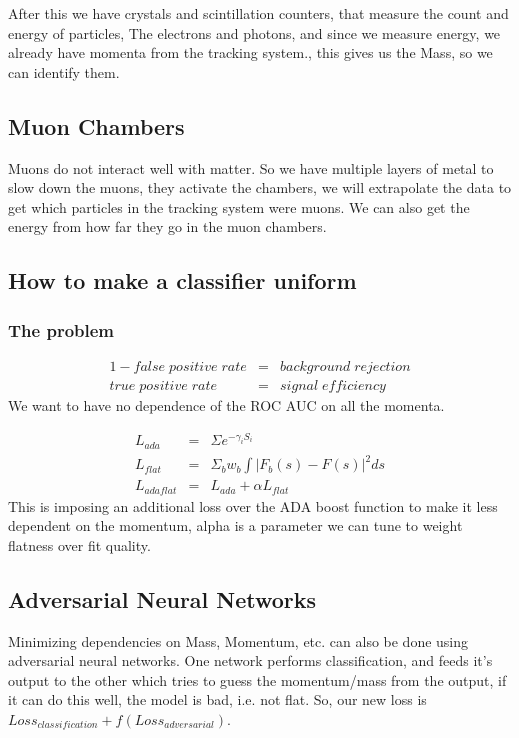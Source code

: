 After this we have crystals and scintillation counters, that measure the count and energy of particles, The electrons and photons, and since we measure energy, we already have momenta from the tracking system., this gives us the Mass, so we can identify them.

\subsection{Muon Chambers}

Muons do not interact well with matter. So we have multiple layers of metal to slow down the muons, they activate the chambers, we will extrapolate the data to get which particles in the tracking system were muons. We can also get the energy from how far they go in the muon chambers.


\subsection{How to make a classifier uniform}

\subsubsection{The problem}
\begin{eqnarray}
1 - false\;positive\;rate &=& background\;rejection \\
true\;positive\;rate &=& signal\;efficiency
\end{eqnarray}
We want to have no dependence of the ROC AUC on all the momenta.

\begin{eqnarray}
  L_{ada} &=& \Sigma e^{-\gamma_i S_i} \\
  L_{flat} &=& \Sigma_b w_b \int |F_b(s) - F(s)|^2 ds \\
  L_{adaflat} &=& L_{ada} + \alpha L_{flat}
\end{eqnarray}
This is imposing an additional loss over the ADA boost function to make it less dependent on the momentum, alpha is a parameter we can tune to weight flatness over fit quality.

\subsection{Adversarial Neural Networks}

Minimizing dependencies on Mass, Momentum, etc. can also be done using adversarial neural networks. One network performs classification, and feeds it's output to the other which tries to guess the momentum/mass from the output, if it can do this well, the model is bad, i.e. not flat. So, our new loss is $Loss_{classification} + f(Loss_{adversarial})$.


